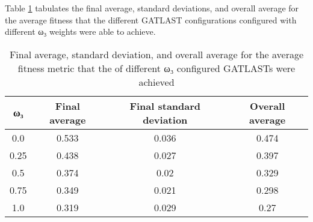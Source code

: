 Table \ref{tab:HP:GA:GWeight:average fitness} tabulates the final average, standard deviations, and overall average for the average fitness that the different GATLAST configurations configured with different ω₃ weights were able to achieve.
\begin{table}[tbh!]
\centering
\begin{adjustbox}{trim=0cm 0cm 0cm 0cm, clip=true}
\begin{tabular}{|c|c|c|c|}
\hline
ω₃ & Final average & Final standard deviation & Overall average\\
\hline
0.0 & 0.533 & 0.036 & 0.474\\\hline
0.25 & 0.438 & 0.027 & 0.397\\\hline
0.5 & 0.374 & 0.02 & 0.329\\\hline
0.75 & 0.349 & 0.021 & 0.298\\\hline
1.0 & 0.319 & 0.029 & 0.27\\\hline
\end{tabular}
\end{adjustbox}
\caption{Final average, standard deviation, and overall average for the average fitness metric that the of different ω₃ configured GATLASTs were achieved}
\label{tab:HP:GA:GWeight:average fitness}
\end{table}